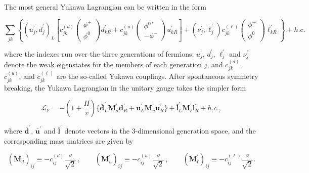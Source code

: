 The most general Yukawa Lagrangian can be written in the form

\begin{equation}\label{eqn:SM_e39}
\sum_{jk}\left\{
(\bar{u}^\prime_j , \bar{d}^\prime_j)_L
\left[
c^{(d)}_{jk}
\begin{pmatrix}
  \phi^+ \\ \phi^0
\end{pmatrix}
d^\prime_{kR} + c^{(u)}_{jk}
\begin{pmatrix}
  \phi^{0*} \\ -\phi^-
\end{pmatrix}
u^\prime_{kR}
\right]
+ (\bar{\nu}^\prime_j , \bar{\ell}^\prime_j) c^{(\ell)}_{jk}
\begin{pmatrix}
  \phi^+ \\ \phi^0
\end{pmatrix}
\ell^\prime_{kR}
\right\} + h.c.
\end{equation}

\noindent where the indexes run over the three generations of fermions;
$u^\prime_j$, $d^\prime_j$, $\ell^\prime_j$ and $\nu^\prime_j$ denote the weak eigenstates for the members of each generation $j$,
and $c^{(d)}_{jk}$, $c^{(u)}_{jk}$, and $c^{(\ell)}_{jk}$ are the so-called Yukawa couplings.
After spontaneous symmetry breaking, the Yukawa Lagrangian in the unitary gauge takes the simpler form

\begin{equation}\label{eqn:SM_e40}
\mathcal{L}_Y = - (1+\frac{H}{v})\{ \bar{\mathbf{d}}^\prime_L \mathbf{M}^\prime_d \mathbf{d}^\prime_R +  \bar{\mathbf{u}}^\prime_L \mathbf{M}^\prime_u \mathbf{u}^\prime_R\}
+ \bar{\mathbf{l}}^\prime_L \mathbf{M}^\prime_\ell \mathbf{l}^\prime_R + h.c. ,
\end{equation}

\noindent where $\bar{\mathbf{d}}^\prime$, $\bar{\mathbf{u}}^\prime$ and $\bar{\mathbf{l}}^\prime$ denote vectors in the 3-dimensional generation space, and the corresponding mass matrices are given by

\begin{equation}\label{eqn:SM_e41}
(\mathbf{M}^\prime_d)_{ij} \equiv -c^{(d)}_{ij}\frac{v}{\sqrt{2}} \, , \qquad (\mathbf{M}^\prime_u)_{ij} \equiv -c^{(u)}_{ij}\frac{v}{\sqrt{2}} \, , \qquad (\mathbf{M}^\prime_\ell)_{ij} \equiv -c^{(\ell)}_{ij}\frac{v}{\sqrt{2}}.
\end{equation}

